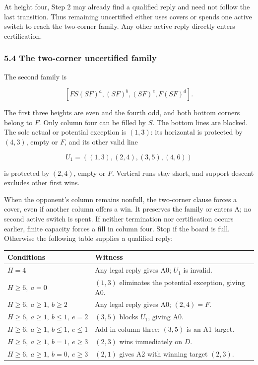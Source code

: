 \documentclass[
  a4paper,
]{article}
\newcounter{none} %
\begin{document}
At height four, Step 2 may already find a qualified reply and need not
follow the last transition. Thus remaining uncertified either uses
covers or spends one active switch to reach the two-corner family. Any
other active reply directly enters certification.

\subsubsection{5.4 The two-corner uncertified
family}\label{the-two-corner-uncertified-family}

The second family is

\[[FS(SF)^a,(SF)^b,(SF)^e,F(SF)^d].\]

The first three heights are even and the fourth odd, and both bottom
corners belong to \(F\). Only column four can be filled by \(S\). The
bottom lines are blocked. The sole actual or potential exception is
\((1,3)\): its horizontal is protected by \((4,3)\), empty or \(F\), and
its other valid line

\[U_1=((1,3),(2,4),(3,5),(4,6))\]

is protected by \((2,4)\), empty or \(F\). Vertical runs stay short, and
support descent excludes other first wins.

When the opponent's column remains nonfull, the two-corner clause forces
a cover, even if another column offers a win. It preserves the family or
enters A; no second active switch is spent. If neither termination nor
certification occurs earlier, finite capacity forces a fill in column
four. Stop if the board is full. Otherwise the following table supplies
a qualified reply:

{\def\LTcaptype{none} %
\begin{longtable}[]{@{}
  >{\raggedright\arraybackslash}p{}
  >{\raggedright\arraybackslash}p{}@{}}
\toprule\noalign{}
\begin{minipage}[b]{\linewidth}\raggedright
Conditions
\end{minipage} & \begin{minipage}[b]{\linewidth}\raggedright
Witness
\end{minipage} \\
\midrule\noalign{}
\endhead
\bottomrule\noalign{}
\endlastfoot
\(H=4\) & Any legal reply gives A0; \(U_1\) is invalid. \\
\(H\ge6,\ a=0\) & \((1,3)\) eliminates the potential exception, giving
A0. \\
\(H\ge6,\ a\ge1,\ b\ge2\) & Any legal reply gives A0; \((2,4)=F\). \\
\(H\ge6,\ a\ge1,\ b\le1,\ e=2\) & \((3,5)\) blocks \(U_1\), giving
A0. \\
\(H\ge6,\ a\ge1,\ b\le1,\ e\le1\) & Add in column three; \((3,5)\) is an
A1 target. \\
\(H\ge6,\ a\ge1,\ b=1,\ e\ge3\) & \((2,3)\) wins immediately on
\(D\). \\
\(H\ge6,\ a\ge1,\ b=0,\ e\ge3\) & \((2,1)\) gives A2 with winning target
\((2,3)\). \\
\end{longtable}
}
\end{document}
